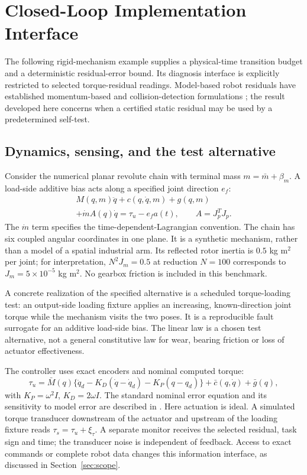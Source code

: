 \section{Closed-Loop Implementation Interface}\label{sec:control}
The following rigid-mechanism example supplies a physical-time transition budget and a deterministic residual-error bound. Its diagnosis interface is explicitly restricted to selected torque-residual readings. Model-based robot residuals have established momentum-based and collision-detection formulations \cite{deluca,haddadin}; the result developed here concerns when a certified static residual may be used by a predetermined self-test.

\subsection{Dynamics, sensing, and the test alternative}
Consider the numerical planar revolute chain with terminal mass $m=\bar m+\beta_m$. A load-side additive bias acts along a specified joint direction $e_f$:
\begin{equation}
 \begin{split}
 M(q,m)\ddot q+c(q,\dot q,m)+g(q,m)\\
 +\dot m A(q)\dot q=\tau_u-e_fa(t),\qquad A=J_p^TJ_p.
 \end{split}\label{eq:plant}
\end{equation}
The $\dot m$ term specifies the time-dependent-Lagrangian convention. The chain has six coupled angular coordinates in one plane. It is a synthetic mechanism, rather than a model of a spatial industrial arm. Its reflected rotor inertia is $0.5$ kg m$^2$ per joint; for interpretation, $N^2J_m=0.5$ at reduction $N=100$ corresponds to $J_m=5\times10^{-5}$ kg m$^2$. No gearbox friction is included in this benchmark.

A concrete realization of the specified alternative is a scheduled torque-loading test: an output-side loading fixture applies an increasing, known-direction joint torque while the mechanism visits the two poses. It is a reproducible fault surrogate for an additive load-side bias. The linear law is a chosen test alternative, not a general constitutive law for wear, bearing friction or loss of actuator effectiveness.

The controller uses exact encoders and nominal computed torque:
\begin{equation}
 \tau_u=\bar M(q)\{\ddot q_d-K_D(\dot q-\dot q_d)-K_P(q-q_d)\}
       +\bar c(q,\dot q)+\bar g(q),\label{eq:controller}
\end{equation}
with $K_P=\omega^2I$, $K_D=2\omega I$. The standard nominal error equation and its sensitivity to model error are described in \cite{lynch}. Here actuation is ideal. A simulated torque transducer downstream of the actuator and upstream of the loading fixture reads $\tau_s=\tau_u+\xi_\tau$. A separate monitor receives the selected residual, task sign and time; the transducer noise is independent of feedback. Access to exact commands or complete robot data changes this information interface, as discussed in Section~\ref{sec:scope}.

